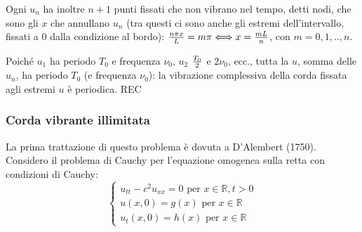 \documentclass{article}
\begin{document}
Ogni $u_{n}$ ha inoltre $n+1$ punti fissati che non vibrano nel tempo, detti
nodi, che sono gli $x$ che annullano $u_{n}$ (tra questi ci sono anche gli
estremi dell'intervallo, fissati a $0$ dalla condizione al bordo): $\frac{%
n\pi x}{L}=m\pi \Longleftrightarrow x=\frac{mL}{n}$, con $m=0,1,..,n$.

Poich\'{e} $u_{1}$ ha periodo $T_{0}$ e frequenza $\nu _{0}$, $u_{2}$ $\frac{%
T_{0}}{2}$ e $2\nu _{0}$, ecc., tutta la $u$, somma delle $u_{n}$, ha
periodo $T_{0}$ (e frequenza $\nu _{0}$): la vibrazione complessiva della
corda fissata agli estremi $u$ \`{e} periodica. REC

\subsubsection{Corda vibrante illimitata}

La prima trattazione di questo problema \`{e} dovuta a D'Alembert (1750).
Considero il problema di Cauchy per l'equazione omogenea sulla retta con
condizioni di Cauchy:%
\begin{equation*}
\left\{ 
\begin{array}{c}
u_{tt}-c^{2}u_{xx}=0\text{ per }x\in 
\mathbb{R}
,t>0 \\ 
u\left( x,0\right) =g\left( x\right) \text{ per }x\in 
\mathbb{R}
\\ 
u_{t}\left( x,0\right) =h\left( x\right) \text{ per }x\in 
\mathbb{R}%
\end{array}%
\right.
\end{equation*}
\end{document}
